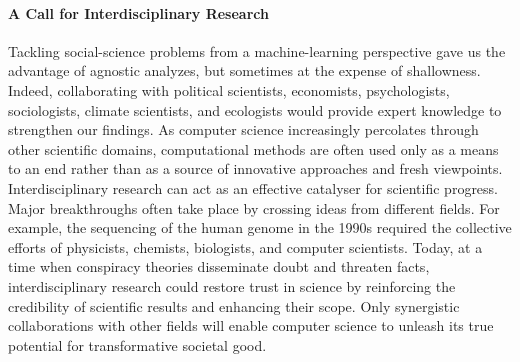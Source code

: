 \paragraph{A Call for Interdisciplinary Research}

Tackling social-science problems from a machine-learning perspective gave us the advantage of agnostic analyzes, but sometimes at the expense of shallowness.
Indeed, collaborating with political scientists, economists, psychologists, sociologists, climate scientists, and ecologists would provide expert knowledge to strengthen our findings.
As computer science increasingly percolates through other scientific domains, computational methods are often used only as a means to an end rather than as a source of innovative approaches and fresh viewpoints.
Interdisciplinary research can act as an effective catalyser for scientific progress.
Major breakthroughs often take place by crossing ideas from different fields.
For example, the sequencing of the human genome in the 1990s required the collective efforts of physicists, chemists, biologists, and computer scientists.
Today, at a time when conspiracy theories disseminate doubt and threaten facts, interdisciplinary research could restore trust in science by reinforcing the credibility of scientific results and enhancing their scope.
Only synergistic collaborations with other fields will enable computer science to unleash its true potential for transformative societal good.

